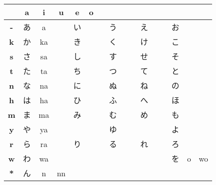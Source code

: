 

\bigskip
\begin{center}	
\Huge

\begin{tabular}{c||c|c|c|c|c|}
&\textbf{a}&\textbf{i}&\textbf{u}&\textbf{e}&\textbf{o}\\\hline\hline 
\textbf{-}&あ&a&&い&&&う&&&え&&&お&&\\\hline 
\textbf{k}&か&ka&&き&&&く&&&け&&&こ&&\\\hline 
\textbf{s}&さ&sa&&し&&&す&&&せ&&&そ&&\\\hline 
\textbf{t}&た&ta&&ち&&&つ&&&て&&&と&&\\\hline 
\textbf{n}&な&na&&に&&&ぬ&&&ね&&&の&&\\\hline 
\textbf{h}&は&ha&&ひ&&&ふ&&&へ&&&ほ&&\\\hline 
\textbf{m}&ま&ma&&み&&&む&&&め&&&も&&\\\hline 
\textbf{y}&や&ya&&  &&&ゆ&&&  &&&よ&&\\\hline 
\textbf{r}&ら&ra&&り&&&る&&&れ&&&ろ&&\\\hline 
\textbf{w}&わ&wa&&  &&&  &&&  &&&を&o&wo\\\hline 
\textbf{{*}}&ん &n&nn& &&& &&& &&& &&\\ \hline 
\end{tabular}
\end{center}
